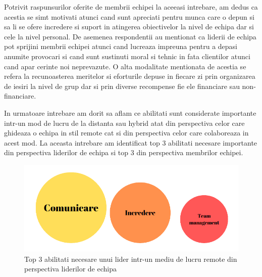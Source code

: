 \documentclass[a4paper, 12pt]{article}
\begin{document}
	\quad Potrivit raspunsurilor oferite de membrii echipei la aceeasi intrebare, am dedus ca acestia se simt motivati atunci cand sunt apreciati pentru munca care o depun si sa li se ofere incredere si suport in atingerea obiectivelor la nivel de echipa dar si cele la nivel personal. De asemenea respondentii au mentionat ca liderii de echipa pot sprijini membrii echipei atunci cand lucreaza impreuna pentru a depasi anumite provocari si cand sunt sustinuti moral si tehnic in fata clientilor atunci cand apar cerinte noi neprevazute. O alta modalitate mentionata de acestia se refera la recunoasterea meritelor si eforturile depuse in fiecare zi prin organizarea de iesiri la nivel de grup dar si prin diverse recompense fie ele financiare sau non-financiare.

	\quad In urmatoare intrebare am dorit sa aflam ce abilitati sunt considerate importante intr-un mod de lucru de la distanta sau hybrid atat din perspectiva celor care ghideaza o echipa in stil remote cat si din perspectiva celor care colaboreaza in acest mod. La aceasta intrebare am identificat top 3 abilitati necesare importante din perspectiva liderilor de echipa si top 3  din perspectiva membrilor echipei.

	\quad \begin{figure}[!htb]
			\centering
			\includegraphics[width=15cm, height=6 cm]{"figures/team leaders remote.png"}
			\caption {Top 3 abilitati necesare unui lider intr-un mediu de lucru remote din perspectiva liderilor de echipa}\label{fig:four}
			
		\end{figure}
	
\end{document}
